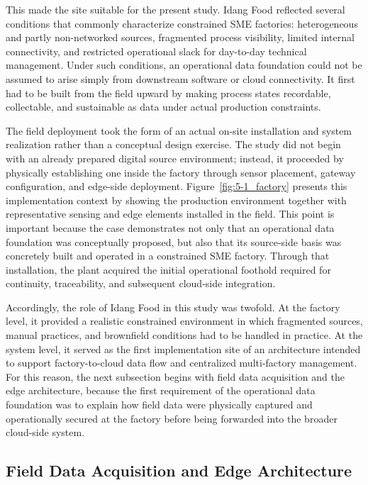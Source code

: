 \documentclass[systems,article,submit,pdftex,moreauthors]{Definitions/mdpi}
\begin{document}
This made the site suitable for the present study. Idang Food reflected several conditions that commonly characterize constrained SME factories: heterogeneous and partly non-networked sources, fragmented process visibility, limited internal connectivity, and restricted operational slack for day-to-day technical management. Under such conditions, an operational data foundation could not be assumed to arise simply from downstream software or cloud connectivity. It first had to be built from the field upward by making process states recordable, collectable, and sustainable as data under actual production constraints.

The field deployment took the form of an actual on-site installation and system realization rather than a conceptual design exercise. The study did not begin with an already prepared digital source environment; instead, it proceeded by physically establishing one inside the factory through sensor placement, gateway configuration, and edge-side deployment. Figure~\ref{fig:5-1_factory} presents this implementation context by showing the production environment together with representative sensing and edge elements installed in the field. This point is important because the case demonstrates not only that an operational data foundation was conceptually proposed, but also that its source-side basis was concretely built and operated in a constrained SME factory. Through that installation, the plant acquired the initial operational foothold required for continuity, traceability, and subsequent cloud-side integration.

Accordingly, the role of Idang Food in this study was twofold. At the factory level, it provided a realistic constrained environment in which fragmented sources, manual practices, and brownfield conditions had to be handled in practice. At the system level, it served as the first implementation site of an architecture intended to support factory-to-cloud data flow and centralized multi-factory management. For this reason, the next subsection begins with field data acquisition and the edge architecture, because the first requirement of the operational data foundation was to explain how field data were physically captured and operationally secured at the factory before being forwarded into the broader cloud-side system.


\subsection{Field Data Acquisition and Edge Architecture}
\label{sec:field_acquisition_edge}
\end{document}
